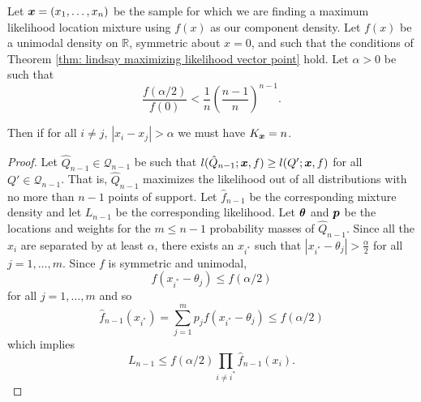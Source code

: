 		\begin{theorem}
			Let ${\bm{{x}}} = (x_1, \dots, x_n)$ be the sample for which we are finding a maximum likelihood location mixture using $f(x)$ as our component density. Let $f(x)$ be a unimodal density on $\mathbb{R}$, symmetric about $x = 0$, and such that the conditions of Theorem \ref{thm: lindsay maximizing likelihood vector point} hold. Let $\alpha > 0$ be such that
			\begin{equation}
				\frac{f(\alpha/2)}{f(0)} < \frac{1}{n}\left(\frac{n-1}{n}\right)^{n-1}.
				\label{eq:alpha condition}
			\end{equation}
			

			Then if for all $i\neq j$, $|x_i - x_j| > \alpha$ we must have $K_{\bm{{x}}} = n$.
		\end{theorem}
		\begin{proof}
			Let $\hat{Q}_{n-1} \in \mathcal{Q}_{n-1}$ be such that $l(\hat{Q}_{n-1}; {\bm{{x}}}, f) \geq l(Q';{\bm{{x}}}, f)$ for all $Q' \in \mathcal{Q}_{n-1}$. That is, $\hat{Q}_{n-1}$ maximizes the likelihood out of all distributions with no more than $n -1$ points of support. Let $\hat{f}_{n-1}$ be the corresponding mixture density and let $L_{n-1}$ be the corresponding likelihood.
			Let ${\bm{{\theta}}}$ and ${\bm{{p}}}$ be the locations and weights for the $m \leq n-1$ probability masses of $\hat{Q}_{n-1}$. %
			Since all the $x_i$ are separated by at least $\alpha$, there exists an $x_{i^*}$ such that $|x_{i^*} - \theta_j|>\frac{\alpha}{2}$ for all $j = 1, \dots, m$. Since $f$ is symmetric and unimodal,
			\begin{equation}
				f(x_{i^*} - \theta_j) \leq f(\alpha/2)
			\end{equation}
			for all $j = 1, \dots, m$ and so
			\begin{equation}
				\hat{f}_{n-1}(x_{i^*})  = \sum_{j = 1}^m p_j f(x_{i^*} - \theta_j) \leq f(\alpha/2)
			\end{equation}
			which implies
			\begin{equation}
				L_{n-1} \leq f(\alpha/2) \prod_{i\neq i^*} \hat{f}_{n-1}(x_{i}).	
			\end{equation}
						

\end{proof}
